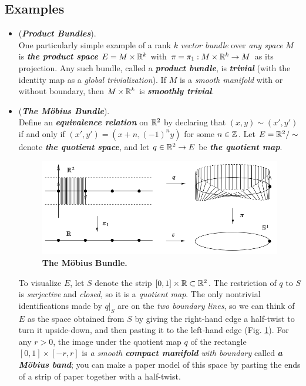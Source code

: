 \documentclass[11pt]{article}
\begin{document}
\subsection{Examples}
\begin{itemize}
\item \begin{example} (\emph{\textbf{Product Bundles}}). \\
One particularly simple example of a rank $k$ \emph{vector bundle} over \emph{any space} $M$ is \emph{\textbf{the product space}} $E =  M \times {\mathbb R}^k$ with $\pi = \pi_1: M \times {\mathbb R}^k \rightarrow M$ as its projection. Any such bundle, called a \emph{\textbf{product bundle}}, is \emph{\textbf{trivial}} (with the identity map as a \emph{global trivialization}). If $M$ is a \emph{smooth manifold} with or without boundary, then $M \times {\mathbb R}^k$ is \emph{\textbf{smoothly trivial}}.
\end{example}

\item \begin{example} (\emph{\textbf{The M{\"o}bius Bundle}}). \\
Define an \emph{\textbf{equivalence relation}} on ${\mathbb R}^2$ by declaring that $(x,y) \sim (x' , y')$ if and only if $(x', y') =(x + n, (-1)^{n}y)$ for some
$n \in {\mathbb Z}$. Let $E = {\mathbb R}^2 / \sim$ denote \emph{\textbf{the quotient space}}, and let $q\in  {\mathbb R}^{2} \rightarrow E$ be \emph{\textbf{the quotient map}}.


\begin{figure}[htb]
\centering
\begin{minipage}{0.5\linewidth}
 \centerline{\includegraphics[scale = 0.45]{mobius_bundle.png}}
\end{minipage}
\caption{\scriptsize
\textbf{The M{\"o}bius Bundle. \citep{lee2003introduction} }}
\label{fig: mobius_bundle}
\end{figure}

To visualize $E$, let $S$ denote the strip $[0,1] \times {\mathbb R} \subset {\mathbb R}^2$. The restriction of $q$ to $S$ is \emph{surjective} and \emph{closed}, so it is a \emph{quotient map}. The only nontrivial identifications made by $q|_{S}$ are on the \emph{two boundary lines}, so we can think of $E$ as the space obtained from $S$ by giving the right-hand edge a half-twist to turn it upside-down, and then pasting it to the left-hand edge (Fig. \ref{fig: mobius_bundle}). For any $r > 0$, the image under the quotient map $q$ of the rectangle $[0,1] \times [-r,r]$ is \emph{a smooth \textbf{compact manifold} with boundary} called \emph{\textbf{a M\"obius band}}; you can make a paper model of this space by pasting the ends of a strip of paper together with a half-twist.


\end{example}
\end{itemize}
\end{document}
